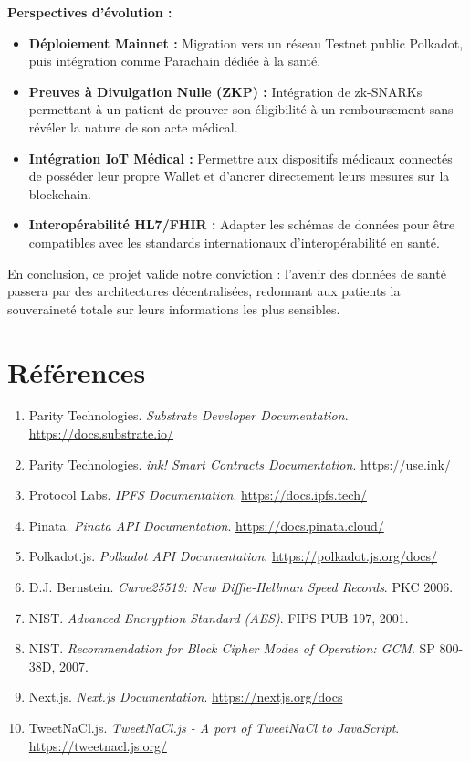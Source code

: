 \documentclass[12pt,a4paper]{report}
\begin{document}
\textbf{Perspectives d'évolution :}
\begin{itemize}
    \item \textbf{Déploiement Mainnet :} Migration vers un réseau Testnet public Polkadot, puis intégration comme Parachain dédiée à la santé.
    \item \textbf{Preuves à Divulgation Nulle (ZKP) :} Intégration de zk-SNARKs permettant à un patient de prouver son éligibilité à un remboursement sans révéler la nature de son acte médical.
    \item \textbf{Intégration IoT Médical :} Permettre aux dispositifs médicaux connectés de posséder leur propre Wallet et d'ancrer directement leurs mesures sur la blockchain.
    \item \textbf{Interopérabilité HL7/FHIR :} Adapter les schémas de données pour être compatibles avec les standards internationaux d'interopérabilité en santé.
\end{itemize}

En conclusion, ce projet valide notre conviction : l'avenir des données de santé passera par des architectures décentralisées, redonnant aux patients la souveraineté totale sur leurs informations les plus sensibles.

\chapter*{Références}

\begin{enumerate}
    \item Parity Technologies. \textit{Substrate Developer Documentation}. \url{https://docs.substrate.io/}
    \item Parity Technologies. \textit{ink! Smart Contracts Documentation}. \url{https://use.ink/}
    \item Protocol Labs. \textit{IPFS Documentation}. \url{https://docs.ipfs.tech/}
    \item Pinata. \textit{Pinata API Documentation}. \url{https://docs.pinata.cloud/}
    \item Polkadot.js. \textit{Polkadot API Documentation}. \url{https://polkadot.js.org/docs/}
    \item D.J. Bernstein. \textit{Curve25519: New Diffie-Hellman Speed Records}. PKC 2006.
    \item NIST. \textit{Advanced Encryption Standard (AES)}. FIPS PUB 197, 2001.
    \item NIST. \textit{Recommendation for Block Cipher Modes of Operation: GCM}. SP 800-38D, 2007.
    \item Next.js. \textit{Next.js Documentation}. \url{https://nextjs.org/docs}
    \item TweetNaCl.js. \textit{TweetNaCl.js - A port of TweetNaCl to JavaScript}. \url{https://tweetnacl.js.org/}
\end{enumerate}
\end{document}

